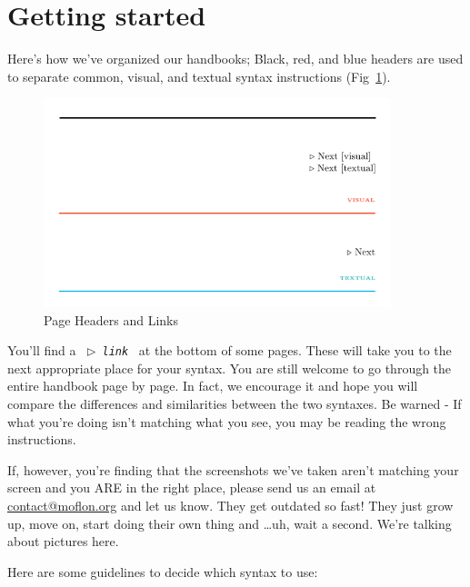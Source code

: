 \section{Getting started}
\genHeader 

Here's how we've organized our handbooks; Black, red, and blue headers are used to separate common, visual, and textual syntax
instructions (Fig~\ref{pageExamples}).

\begin{figure}[htbp] \centering
  \includegraphics[width=0.9\textwidth]{headers}
	\caption{Page Headers and Links} 
	\label{pageExamples} 
\end{figure}

You'll find a \mbox{ $\triangleright$ {\texttt {\emph{link}}} } at the bottom of some pages. These will take you to the next
appropriate place for your syntax. You are still welcome to go through the entire handbook page by page. In fact, we encourage it and hope you will compare the
differences and similarities between the two syntaxes. Be warned - If what you're doing isn't matching what you see, you may be reading the wrong
instructions.


If, however, you're finding that the screenshots we've taken aren't matching your screen and you ARE in the right place, please send us an email at
\href{mailto:contact@moflon.org}{contact@moflon.org} and let us know. They get outdated so fast! They just grow up, move on, start doing their own thing and
\ldots uh, wait a second. We're talking about pictures here.

Here are some guidelines to decide which syntax to use:

